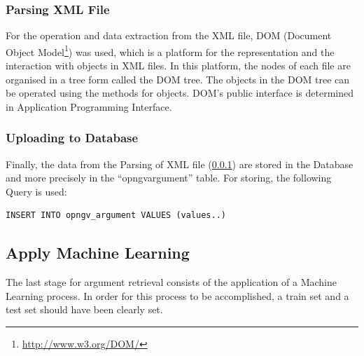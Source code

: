 \subsubsection{Parsing XML File}\label{3223_ref}
For the operation and data extraction from the XML file, DOM (Document Object Model\footnote{\url{http://www.w3.org/DOM/}}) was used, which is a platform for the representation and the interaction with objects in XML files. In this platform, the nodes of each file are organised in a tree form called the DOM tree. The objects in the DOM tree can be operated using the methods for objects. DOM's public interface is determined in Application Programming Interface.

\subsubsection{Uploading to Database}\label{3224_ref}
Finally, the data from the Parsing of XML file (\ref{3223_ref}) are stored in the Database and more precisely in the ``opngv\textunderscore argument'' table. For storing, the following Query is used:\\
\lstset{language=SQL}
\begin{lstlisting}[frame=single, basicstyle=\small]
INSERT INTO opngv_argument VALUES (values..)
\end{lstlisting}

\subsection{Apply Machine Learning}\label{323_ref}
The last stage for argument retrieval consists of the application of a Machine Learning process. In order for this process to be accomplished, a train set and a test set should have been clearly set.


